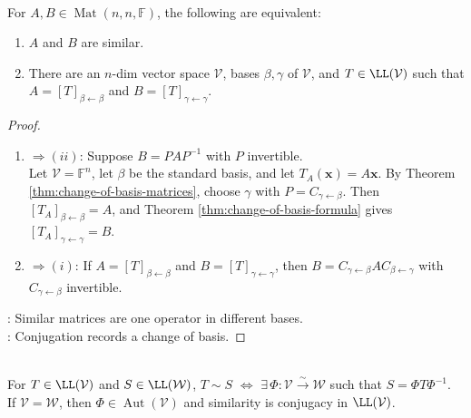 \begin{corollary} \label{cor:similar-iff-same-linear-operator} \\
For $A,B\in\operatorname{Mat}(n,n,\mathbb{F})$, the following are equivalent:
\begin{enumerate}[label=(\roman*)]
\setlength{\itemsep}{0pt}
\item $A$ and $B$ are similar.
\item There are an $n$-dim vector space $\mathcal{V}$, bases $\beta,\gamma$ of $\mathcal{V}$, and $T\in\LL(\mathcal{V})$ such that $A=[T]_{\beta \leftarrow \beta}$ and $B=[T]_{\gamma \leftarrow \gamma}$.
\end{enumerate}
\begin{proof}
\begin{enumerate}[label=(\roman)*.]
\setlength{\itemsep}{0pt}
\item[$(i)$] $\Rightarrow (ii)$: Suppose $B=PAP^{-1}$ with $P$ invertible.\\
Let $\mathcal{V}=\mathbb{F}^n$, let $\beta$ be the standard basis, and let $T_A(\mathbf{x})=A\mathbf{x}$. By Theorem \ref{thm:change-of-basis-matrices}, choose $\gamma$ with $P=C_{\gamma \leftarrow \beta}$. Then $[T_A]_{\beta \leftarrow \beta}=A$, and Theorem \ref{thm:change-of-basis-formula} gives $[T_A]_{\gamma \leftarrow \gamma}=B$.
\item[$(ii)$] $\Rightarrow (i)$: If $A=[T]_{\beta \leftarrow \beta}$ and $B=[T]_{\gamma \leftarrow \gamma}$, then $B=C_{\gamma \leftarrow \beta}AC_{\beta \leftarrow \gamma}$ with $C_{\gamma \leftarrow \beta}$ invertible.
\end{enumerate}
: Similar matrices are one operator in different bases.\\
: Conjugation records a change of basis.
\end{proof}
\end{corollary}

\begin{definition} \label{def:similar-linear-operators} \\
For $T\in\LL(\mathcal{V})$ and $S\in\LL(\mathcal{W})$, $T\sim S$ $\Longleftrightarrow$ $\exists\,\Phi:\mathcal{V}\xrightarrow{\sim}\mathcal{W}$ such that $ S=\Phi T\Phi^{-1}$.\\
If $\mathcal{V}=\mathcal{W}$, then $\Phi\in\operatorname{Aut}(\mathcal{V})$ and similarity is conjugacy in $\LL(\mathcal{V})$.
\end{definition}

